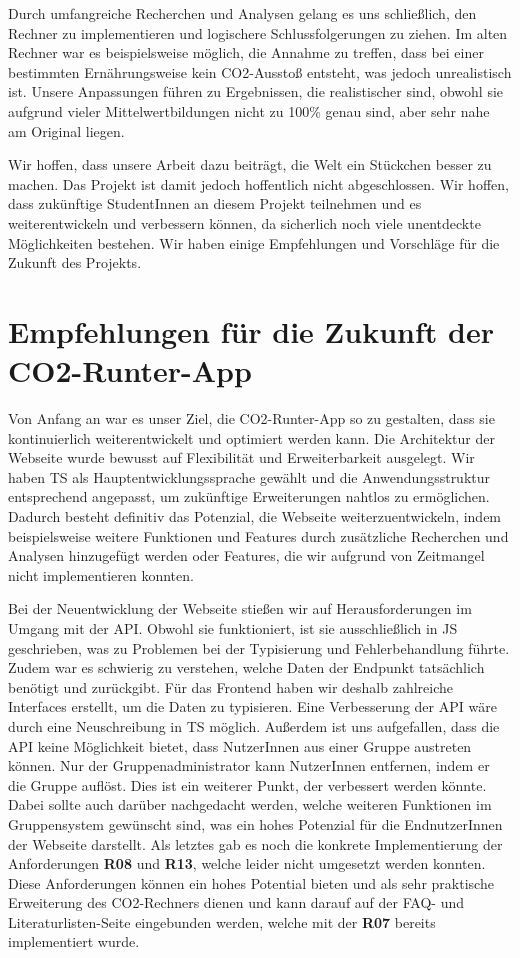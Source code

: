 Durch umfangreiche Recherchen und Analysen gelang es uns schließlich, den Rechner zu implementieren und logischere Schlussfolgerungen zu ziehen. Im alten Rechner war es beispielsweise möglich, die Annahme zu treffen, dass bei einer bestimmten Ernährungsweise kein CO2-Ausstoß entsteht, was jedoch unrealistisch ist. Unsere Anpassungen führen zu Ergebnissen, die realistischer sind, obwohl sie aufgrund vieler Mittelwertbildungen nicht zu 100\% genau sind, aber sehr nahe am Original liegen.

Wir hoffen, dass unsere Arbeit dazu beiträgt, die Welt ein Stückchen besser zu machen. Das Projekt ist damit jedoch hoffentlich nicht abgeschlossen. Wir hoffen, dass zukünftige StudentInnen an diesem Projekt teilnehmen und es weiterentwickeln und verbessern können, da sicherlich noch viele unentdeckte Möglichkeiten bestehen. Wir haben einige Empfehlungen und Vorschläge für die Zukunft des Projekts.

\section{Empfehlungen für die Zukunft der CO2-Runter-App}

Von Anfang an war es unser Ziel, die CO2-Runter-App so zu gestalten, dass sie kontinuierlich weiterentwickelt und optimiert werden kann. Die Architektur der Webseite wurde bewusst auf Flexibilität und Erweiterbarkeit ausgelegt. Wir haben \acl{TS} als Hauptentwicklungssprache gewählt und die Anwendungsstruktur entsprechend angepasst, um zukünftige Erweiterungen nahtlos zu ermöglichen. Dadurch besteht definitiv das Potenzial, die Webseite weiterzuentwickeln, indem beispielsweise weitere Funktionen und Features durch zusätzliche Recherchen und Analysen hinzugefügt werden oder Features, die wir aufgrund von Zeitmangel nicht implementieren konnten.

Bei der Neuentwicklung der Webseite stießen wir auf Herausforderungen im Umgang mit der \acs{API}. Obwohl sie funktioniert, ist sie ausschließlich in \acl{JS} geschrieben, was zu Problemen bei der Typisierung und Fehlerbehandlung führte. Zudem war es schwierig zu verstehen, welche Daten der Endpunkt tatsächlich benötigt und zurückgibt. Für das Frontend haben wir deshalb zahlreiche Interfaces erstellt, um die Daten zu typisieren. Eine Verbesserung der \acs{API} wäre durch eine Neuschreibung in \acl{TS} möglich. Außerdem ist uns aufgefallen, dass die \acs{API} keine Möglichkeit bietet, dass NutzerInnen aus einer Gruppe austreten können. Nur der Gruppenadministrator kann NutzerInnen entfernen, indem er die Gruppe auflöst. Dies ist ein weiterer Punkt, der verbessert werden könnte. Dabei sollte auch darüber nachgedacht werden, welche weiteren Funktionen im Gruppensystem gewünscht sind, was ein hohes Potenzial für die EndnutzerInnen der Webseite darstellt. Als letztes gab es noch die konkrete Implementierung der Anforderungen \textbf{R08} und \textbf{R13}, welche leider nicht umgesetzt werden konnten. Diese Anforderungen können ein hohes Potential bieten und als sehr praktische Erweiterung des CO2-Rechners dienen und kann darauf auf der FAQ- und Literaturlisten-Seite eingebunden werden, welche mit der \textbf{R07} bereits implementiert wurde.

